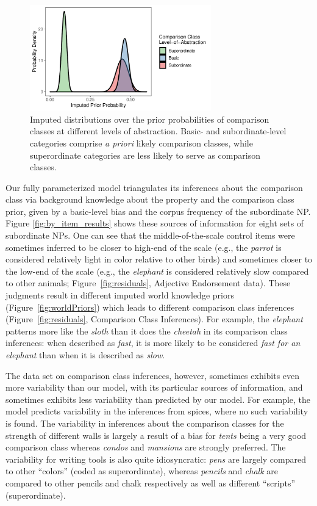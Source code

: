 \documentclass[doc, floatsintext]{apa6}
\begin{document}
\begin{figure}[t]
\centering
\includegraphics[width=0.7\textwidth]{figs/model_comparisonClassPriorParameters.pdf}
\caption{Imputed distributions over the prior probabilities of comparison classes at different levels of abstraction. Basic- and subordinate-level categories comprise \emph{a priori} likely comparison classes, while superordinate categories are less likely to serve as comparison classes.}\label{fig:parameters}
\end{figure}


Our fully parameterized model triangulates its inferences about the comparison class via background knowledge about the property and the comparison class prior, given by a basic-level bias and the corpus frequency of the subordinate NP. Figure \ref{fig:by_item_results} shows these sources of information for eight sets of subordinate NPs. 
One can see that the middle-of-the-scale control items were sometimes inferred to be closer to high-end of the scale (e.g., the \emph{parrot} is considered relatively light in color relative to other birds) and sometimes closer to the low-end of the scale (e.g., the \emph{elephant} is considered relatively slow compared to other animals; Figure~\ref{fig:residuals}, Adjective Endorsement data). These judgments result in different imputed  world knowledge priors (Figure~\ref{fig:worldPriors}) which leads to different comparison class inferences (Figure~\ref{fig:residuals}, Comparison Class Inferences). For example, the \emph{elephant} patterns more like the \emph{sloth} than it does the \emph{cheetah} in its comparison class inferences: when described as \emph{fast}, it is more likely to be considered \emph{fast for an elephant} than when it is described as \emph{slow}.

The data set on comparison class inferences, however, sometimes exhibits even more variability than our model, with its particular sources of information, and sometimes exhibits less variability than predicted by our model. 
For example, the model predicts variability in the inferences from spices, where no such variability is found. 
The variability in inferences about the comparison classes for the strength of different walls is largely a result of a bias for \emph{tents} being a very good comparison class whereas \emph{condos} and \emph{mansions} are strongly preferred.
The variability for writing tools is also quite idiosyncratic: \emph{pens} are largely compared to other ``colors'' (coded as superordinate), whereas \emph{pencils} and \emph{chalk} are compared to other pencils and chalk respectively as well as different ``scripts'' (superordinate). 
\end{document}
